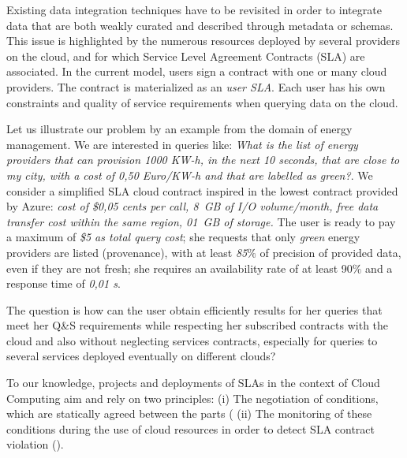 \documentclass[10pt, conference, compsocconf]{IEEEtran}
\begin{document}
Existing data integration techniques have to be revisited in order to integrate data that are both weakly curated and described through metadata or schemas. 
This issue is highlighted by the numerous resources deployed by several providers  on the cloud, and for which Service Level Agreement Contracts (SLA) are associated. 
In the current model, users sign a contract with one or many cloud providers.
The contract is materialized as an \textit{user SLA}. 
Each user has his own constraints and quality of service requirements when querying data on the cloud. 

Let us illustrate our problem by an example from the domain of energy management.
We are interested in queries like: \textit{What is the list of energy providers that can provision 1000 KW-h, in the next 10 seconds, that are close to my city, with a cost of 0,50 Euro/KW-h and that are labelled as green?}. 
We consider a simplified SLA cloud contract inspired in the lowest contract provided by Azure: \textit{cost of \$0,05 cents per call,  8~GB of I/O volume/month, free data transfer cost within the same region,  01~GB of storage.} 
The user is ready to pay a maximum of \textit{\$5 as total query cost}; she requests that only  \textit{green} energy providers are listed (provenance), with at least  \textit{85$\%$} of precision of provided data, even if they are not fresh; she requires an availability rate of at least 90$\%$ and a response time of  \textit{0,01 s}. 

    The question is how can the user  obtain efficiently results for her queries that meet her Q\&S requirements while respecting her subscribed contracts with the cloud and also without neglecting services contracts, especially for queries to several services deployed eventually on different clouds?

To our knowledge, projects and deployments of SLAs in the context of Cloud Computing aim and rely on two principles: (i) The negotiation of conditions, which are statically agreed between the parts (\cite{5547150,Dastjerdi:2012:DOA:2275356.2275360,Ortiz:2013:VPS:2486767.2486772} (ii) The monitoring of these conditions during the use of cloud resources in order to detect SLA contract violation (\cite{6274042,5614035}).
\end{document}
